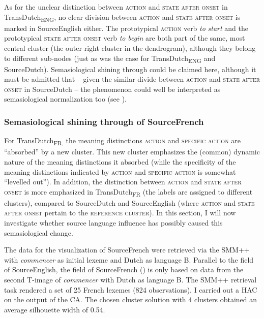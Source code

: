 As for the unclear distinction between \textsc{action} and \textsc{state after onset} in TransDutch\textsubscript{ENG}, no clear division between \textsc{action} and \textsc{state after onset} is marked in SourceEnglish either. The prototypical \textsc{action} verb \textit{to} \textit{start} and the prototypical \textsc{state after onset} verb \textit{to} \textit{begin} are both part of the same, most central cluster (the outer right cluster in the dendrogram), although they belong to different sub-nodes (just as was the case for TransDutch\textsubscript{ENG} and SourceDutch). Semasiological shining through could be claimed here, although it must be admitted that -- given the similar divide between \textsc{action} and \textsc{state after onset} in SourceDutch – the phenomenon could well be interpreted as semasiological normalization too (see ).

\subsubsection{Semasiological shining through of SourceFrench}
\label{sec:4.6.1.2}  
For TransDutch\textsubscript{FR,} the meaning distinctions \textsc{action} and {\textsc{specific}} \textsc{action} are ``absorbed'' by a new cluster. This new cluster emphasizes the (common) dynamic nature of the meaning distinctions it absorbed (while the specificity of the meaning distinctions indicated by \textsc{action} and {\textsc{specific}} \textsc{action} is somewhat ``levelled out''). In addition, the distinction between \textsc{action} and \textsc{state after onset} is more emphasized in TransDutch\textsubscript{FR} (the labels are assigned to different clusters), compared to SourceDutch and SourceEnglish (where \textsc{action} and \textsc{state after onset} pertain to the \textsc{reference cluster}). In this section, I will now investigate whether source language influence has possibly caused this semasiological change.

The data for the visualization of SourceFrench were retrieved via the SMM++ with \textit{commencer} as initial lexeme and Dutch as language B. Parallel to the field of SourceEnglish, the field of SourceFrench () is only based on data from the second T-image of \textit{commencer} with Dutch as language B. The SMM++ retrieval task rendered a set of 25 French lexemes (824 observations). I carried out a HAC on the output of the CA. The chosen cluster solution with 4 clusters obtained an average silhouette width of 0.54.

